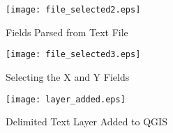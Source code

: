 \begin{figure}[ht]
   \begin{center}
   \caption{Fields Parsed from Text
File}\label{fig:delim_text_file_selected2}\smallskip  
\texttt{[image: file\_selected2.eps]}
   \end{center}  
\end{figure}

\begin{figure}[ht]
   \begin{center}
   \caption{Selecting the X and Y
Fields}\label{fig:delim_text_file_selected3}\smallskip
\texttt{[image: file\_selected3.eps]}
   \end{center}  
\end{figure}

\begin{figure}[ht]
   \begin{center}
   \caption{Delimited Text Layer Added to
QGIS}\label{fig:layer_added}\smallskip
\texttt{[image: layer\_added.eps]}
   \end{center}  
\end{figure}


